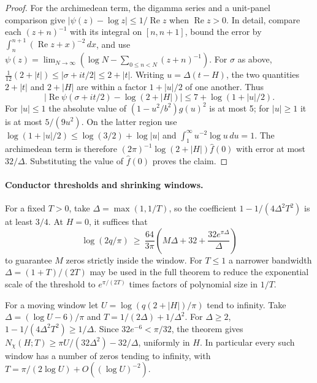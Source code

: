 \documentclass[11pt]{article}
\DeclareMathOperator{\Rea}{Re}
\begin{document}
\begin{proof}
For the archimedean term, the digamma series and a unit-panel comparison give
$|\psi(z)-\log z|\le 1/\Rea z$ when $\Rea z>0$. In detail, compare each
$(z+n)^{-1}$ with its integral on $[n,n+1]$, bound the error by
$\int_n^{n+1}(\Rea z+x)^{-2}\,dx$, and use
$\psi(z)=\lim_{N\to\infty}(\log N-\sum_{0\le n<N}(z+n)^{-1})$.
For $\sigma$ as above, $\tfrac1{12}(2+|t|)\le|\sigma+it/2|\le 2+|t|$.
Writing $u=\Delta(t-H)$, the two quantities $2+|t|$ and $2+|H|$
are within a factor $1+|u|/2$ of one another. Thus
\[
 |\Rea\psi(\sigma+it/2)-\log(2+|H|)|
 \le 7+\log(1+|u|/2).
\]
For $|u|\le1$ the absolute value of $(1-u^2/b^2)g(u)^2$ is at most 5;
for $|u|\ge1$ it is at most $5/(9u^2)$. On the latter region use
$\log(1+|u|/2)\le\log(3/2)+\log|u|$ and
$\int_1^\infty u^{-2}\log u\,du=1$.
The archimedean term is therefore
$(2\pi)^{-1}\log(2+|H|)\widehat f(0)$ with error at most $32/\Delta$.
Substituting the value of $\widehat f(0)$ proves the claim.
\end{proof}

\paragraph{Conductor thresholds and shrinking windows.}
For a fixed $T>0$, take $\Delta=\max(1,1/T)$, so the coefficient
$1-1/(4\Delta^2T^2)$ is at least $3/4$. At $H=0$, it suffices that
\[
 \log(2q/\pi)\ \ge\ \frac{64}{3\pi}
 \left(M\Delta+32+\frac{32e^{\pi\Delta}}{\Delta}\right)
\]
to guarantee $M$ zeros strictly inside the window. For $T\le1$ a
narrower bandwidth $\Delta=(1+T)/(2T)$ may be used in the full theorem
to reduce the exponential scale of the threshold to $e^{\pi/(2T)}$
times factors of polynomial size in $1/T$.

For a moving window let $U=\log(q(2+|H|)/\pi)$ tend to infinity.
Take $\Delta=(\log U-6)/\pi$ and $T=1/(2\Delta)+1/\Delta^2$.
For $\Delta\ge2$, $1-1/(4\Delta^2T^2)\ge 1/\Delta$.
Since $32 e^{-6}<\pi/32$, the theorem gives
$N_\chi(H;T)\ge \pi U/(32\Delta^2)-32/\Delta$, uniformly in $H$.
In particular every such window has a number of zeros tending to infinity, with
$T=\pi/(2\log U)+O((\log U)^{-2})$.
\end{document}
